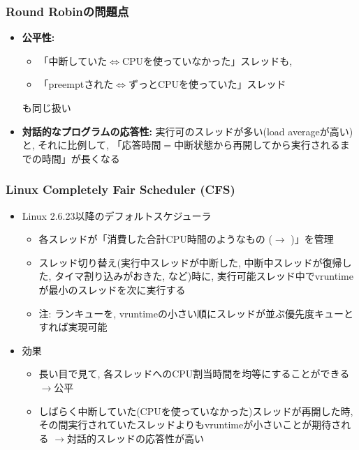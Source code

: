 \documentclass[12pt,dvipdfmx]{beamer}
\begin{document}
\begin{frame}
  \frametitle{Round Robinの問題点}
  \begin{itemize}
  \item {\bf 公平性:}
    \begin{itemize}
    \item 「中断していた$\iff$CPUを使っていなかった」スレッドも,
    \item 「preemptされた$\iff$ずっとCPUを使っていた」スレッド
    \end{itemize}
    も同じ扱い
    
  \item {\bf 対話的なプログラムの応答性:}
    実行可のスレッドが多い(load averageが高い)と,
    それに比例して,
    「応答時間$=$中断状態から再開してから実行されるまでの時間」が長くなる
  \end{itemize}
\end{frame}

\begin{frame}
  \frametitle{Linux Completely Fair Scheduler (CFS)}
  \begin{itemize}
  \item Linux 2.6.23以降のデフォルトスケジューラ
    \begin{itemize}
    \item 各スレッドが「消費した合計CPU時間のようなもの
      ($\rightarrow$ )」を管理 
    \item スレッド切り替え(実行中スレッドが中断した,
      中断中スレッドが復帰した,
      タイマ割り込みがおきた, など)時に,
      実行可能スレッド中でvruntimeが最小のスレッドを次に実行する
    \item 注: ランキューを,
      vruntimeの小さい順にスレッドが並ぶ優先度キューとすれば実現可能
    \end{itemize}
  \item 効果
    \begin{itemize}
    \item 長い目で見て, 各スレッドへのCPU割当時間を均等にすることができる
      \mbox{$\rightarrow$公平}
    \item しばらく中断していた(CPUを使っていなかった)スレッドが再開した時,
      その間実行されていたスレッドよりもvruntimeが小さいことが期待される
      \mbox{$\rightarrow$対話的スレッドの応答性が高い}
    \end{itemize}
  \end{itemize}
\end{frame}
\end{document}
